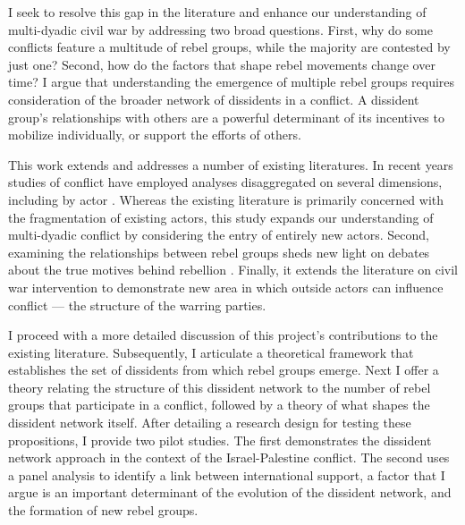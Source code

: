 I seek to resolve this gap in the literature and enhance our understanding of multi-dyadic civil war by addressing two broad questions. First, why do some conflicts feature a multitude of rebel groups, while the majority are contested by just one? Second, how do the factors that shape rebel movements change over time? I argue that understanding the emergence of multiple rebel groups requires consideration of the broader network of dissidents in a conflict. A dissident group's relationships with others are a powerful determinant of its incentives to mobilize individually, or support the efforts of others.

This work extends and addresses a number of existing literatures. In recent years studies of conflict have employed analyses disaggregated on several dimensions, including by actor \citep[e.g.][]{Cunningham2009,Pearlman2011a,Fjelde2012}. Whereas the existing literature is primarily concerned with the fragmentation of existing actors, this study expands our understanding of multi-dyadic conflict by considering the entry of entirely new actors. Second, examining the relationships between rebel groups sheds new light on debates about the true motives behind rebellion \citep[e.g.][]{Collier2004}. Finally, it extends the literature on civil war intervention to demonstrate new area in which outside actors can influence conflict --- the structure of the warring parties.

I proceed with a more detailed discussion of this project's contributions to the existing literature. Subsequently, I articulate a theoretical framework that establishes the set of dissidents from which rebel groups emerge. Next I offer a theory relating the structure of this dissident network to the number of rebel groups that participate in a conflict, followed by a theory of what shapes the dissident network itself. After detailing a research design for testing these propositions, I provide two pilot studies. The first demonstrates the dissident network approach in the context of the Israel-Palestine conflict. The second uses a panel analysis to identify a link between international support, a factor that I argue is an important determinant of the evolution of the dissident network, and the formation of new rebel groups.